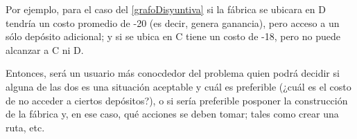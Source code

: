 \documentclass[../tp2_grupo404.tex]{subfiles}
\begin{document}
Por ejemplo, para el caso del \cref{grafoDisyuntiva} si la fábrica se ubicara en
D tendría un costo promedio de -20 (es decir, genera ganancia), pero acceso a un sólo
depósito adicional; y si se ubica en C tiene un costo de -18, pero no puede alcanzar
a C ni D.

Entonces, será un usuario más conocdedor del problema quien podrá decidir si alguna de
las dos es una situación aceptable y cuál es preferible (¿cuál es el costo de no acceder
a ciertos depósitos?), o si sería preferible posponer la construcción de la fábrica y,
en ese caso, qué acciones se deben tomar; tales como crear una ruta, etc.

\end{document}
